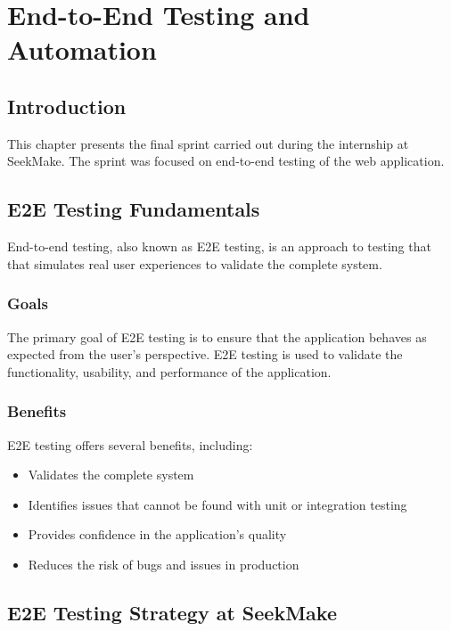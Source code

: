 \chapter{End-to-End Testing and Automation}

\section{Introduction}

This chapter presents the final sprint carried out during the internship at SeekMake. The sprint was focused on end-to-end testing of the web application.

\section{E2E Testing Fundamentals}

End-to-end testing, also known as E2E testing, is an approach to testing that that simulates real user experiences to validate the complete system. \cite{circleci}

\subsection{Goals}

The primary goal of E2E testing is to ensure that the application behaves as expected from the user's perspective. E2E testing is used to validate the functionality, usability, and performance of the application.

\subsection{Benefits}

E2E testing offers several benefits, including:

\begin{itemize}
    \item Validates the complete system
    \item Identifies issues that cannot be found with unit or integration testing
    \item Provides confidence in the application's quality
    \item Reduces the risk of bugs and issues in production
\end{itemize}

\section{E2E Testing Strategy at SeekMake}

